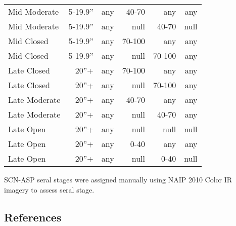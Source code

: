 \begin{table}[hbp]
\begin{tabular}{@{}lrrrrr@{}}
Mid Moderate     & 5-19.9''        & any & 40-70  & any    & any  \\
Mid Moderate     & 5-19.9''        & any & null   & 40-70  & null \\
Mid Closed       & 5-19.9''        & any & 70-100 & any    & any  \\
Mid Closed       & 5-19.9''        & any & null   & 70-100 & any  \\
Late Closed      & 20''+           & any & 70-100 & any    & any  \\
Late Closed      & 20''+           & any & null   & 70-100 & any  \\
Late Moderate    & 20''+           & any & 40-70  & any    & any  \\
Late Moderate    & 20''+           & any & null   & 40-70  & any  \\
Late Open        & 20''+           & any & null   & null   & null \\
Late Open        & 20''+           & any & 0-40   & any    & any  \\
Late Open        & 20''+           & any & null   & 0-40   & null \\ \bottomrule
\end{tabular}
\end{table}

SCN-ASP seral stages were assigned manually using NAIP 2010 Color IR imagery to assess seral stage.


\clearpage

\subsection*{References}

